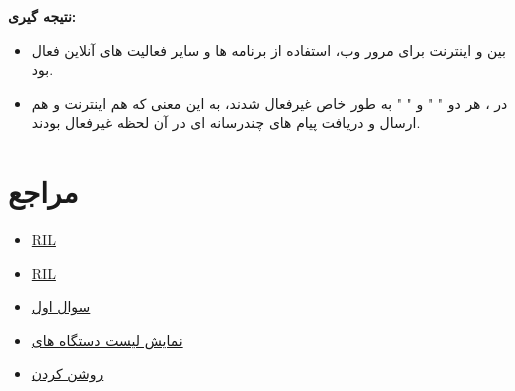 \documentclass[landscape, 12pt]{report}
\begin{document}
\textbf{نتیجه گیری:}
\begin{itemize}
	\item 
	بین
	و
	اینترنت برای مرور وب، استفاده از برنامه ها و سایر فعالیت های آنلاین فعال بود.
	\item 
	در 
	،
	 هر دو
	 "
	 " و "
	 " به طور خاص غیرفعال شدند، به این معنی که هم اینترنت و هم ارسال و دریافت پیام های چندرسانه ای در آن لحظه غیرفعال بودند.
\end{itemize}

\section* {مراجع}
\begin{itemize}
	\item 
	\href{https://www.oreilly.com/library/view/android-hackers-handbook/9781118608647/9781118922255c11.xhtml} {RIL}
	\item 
	\href{https://en.wikipedia.org/wiki/Radio_Interface_Layer} {RIL}
	
	\item 
	\href{https://en.wikipedia.org/wiki/Radio_Interface_Layer} {سوال اول}
	
	\item 
	\href{https://stackoverflow.com/questions/21170392/my-android-device-does-not-appear-in-the-list-of-adb-devices} {نمایش لیست دستگاه های 
	}
	
	\item 
	\href{https://en-gb.support.motorola.com/app/answers/detail/a_id/159678/~/developer-options} {روشن کردن 
	}
	
\end{itemize}
\end{document}

